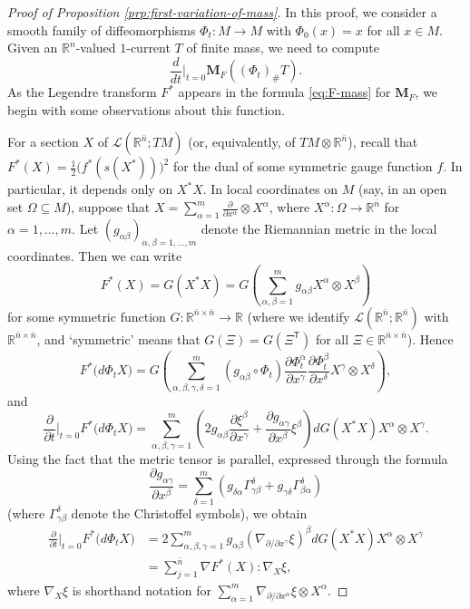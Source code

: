 \documentclass[a4paper]{article}
\newcommand{\R}{\mathbb{R}}
\newcommand{\M}{\mathbf{M}}
\newcommand{\ndim}{{\bar{n}}}
\newcommand{\Lin}{\mathcal{L}}
\newcommand{\transpose}{\mathsf{T}}
\newcommand{\dd}[2]{\frac{\partial #1}{\partial #2}}
\theoremstyle{definition}
\theoremstyle{remark}
\begin{document}
\begin{proof}[Proof of Proposition \ref{prp:first-variation-of-mass}]
In this proof, we consider a smooth family of diffeomorphisms $\Phi_t \colon M \to M$ with $\Phi_0(x) = x$ for all $x \in M$. Given an $\R^n$-valued $1$-current
$T$ of finite mass, we need to compute
\[
\frac{d}{dt}\Bigr|_{t = 0} \M_F((\Phi_t)_\# T).
\]
As the Legendre transform $F^*$ appears in the formula \eqref{eq:F-mass} for $\M_F$, we begin with
some observations about this function.

For a section $X$ of $\Lin(\R^\ndim; TM)$ (or, equivalently, of $TM \otimes \R^\ndim$), recall that $F^*(X) = \frac{1}{2} \bigl(f^*(s(X^*))\bigr)^2$ for the dual of some symmetric gauge function $f$. In particular, it depends only on $X^*X$.
In local coordinates on $M$ (say, in an open set $\Omega \subseteq M$), suppose that
$X = \sum_{\alpha = 1}^m \dd{}{x^\alpha} \otimes X^\alpha$, where $X^\alpha \colon \Omega \to \R^\ndim$ for $\alpha = 1, \dotsc, m$. Let
$(g_{\alpha\beta})_{\alpha, \beta = 1, \dotsc, m}$ denote the Riemannian metric in the local coordinates. Then we can write
\[
F^*(X) = G(X^*X) = G\left(\sum_{\alpha, \beta = 1}^m g_{\alpha\beta} X^\alpha \otimes X^\beta\right)
\]
for some symmetric function $G \colon \R^{\ndim \times \ndim} \to \R$ (where we identify $\Lin(\R^\ndim; \R^\ndim)$ with $\R^{\ndim \times \ndim}$, and
`symmetric' means that $G(\Xi) = G(\Xi^\transpose)$ for all $\Xi \in \R^{\ndim \times \ndim}$).
Hence
\[
F^*\bigl(d\Phi_t X\bigr) =  G\left(\sum_{\alpha, \beta, \gamma, \delta = 1}^m (g_{\alpha\beta} \circ \Phi_t) \dd{\Phi_t^\alpha}{x^\gamma} \dd{\Phi_t^\beta}{x^\delta} X^\gamma \otimes X^\delta\right),
\]
and
\[
\dd{}{t}\Bigr|_{t = 0} F^*\bigl(d\Phi_t X\bigr) = \sum_{\alpha, \beta, \gamma = 1}^m \left(2g_{\alpha\beta} \dd{\xi^\beta}{x^\gamma} + \dd{g_{\alpha\gamma}}{x^\beta} \xi^\beta\right) dG(X^*X) X^\alpha \otimes X^\gamma.
\]
Using the fact that the metric tensor is parallel, expressed through
the formula
\[
\dd{g_{\alpha\gamma}}{x^\beta} = \sum_{\delta = 1}^m (g_{\delta\alpha} \Gamma_{\gamma\beta}^\delta + g_{\gamma\delta} \Gamma_{\beta\alpha}^\delta)
\]
(where $\Gamma_{\gamma\beta}^\delta$ denote the Christoffel symbols), we obtain
\[
\begin{split}
\dd{}{t}\Bigr|_{t = 0} F^*\bigl(d\Phi_t X\bigr) & = 2 \sum_{\alpha, \beta, \gamma = 1}^m g_{\alpha\beta} (\nabla_{\partial/\partial x^\gamma}\xi)^\beta dG(X^*X) X^\alpha \otimes X^\gamma \\
& = \sum_{j = 1}^\ndim \nabla F^*(X) : \nabla_X \xi,
\end{split}
\]
where $\nabla_X \xi$ is shorthand notation for $\sum_{\alpha = 1}^m \nabla_{\partial/\partial x^\alpha} \xi \otimes X^\alpha$.


\end{proof}
\end{document}
